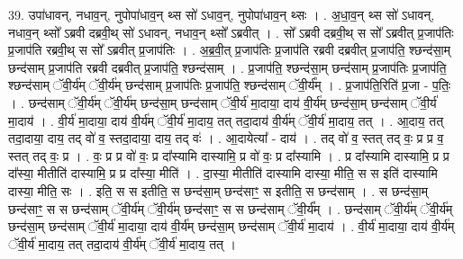 \documentclass[17pt]{extarticle}
\begin{document}
39. उपा॑धावन्, नधाव॒न्, नुपोपा॑धाव॒न् थ्स सो॑ ऽधाव॒न्, नुपोपा॑धाव॒न् थ्सः । . अ॒धा॒व॒न् थ्स सो॑ ऽधावन्, नधाव॒न् थ्सो᳚ ऽब्रवी दब्रवी॒थ् सो॑ ऽधावन्, नधाव॒न् थ्सो᳚ ऽब्रवीत् । . सो᳚ ऽब्रवी दब्रवी॒थ् स सो᳚ ऽब्रवीत् प्र॒जाप॑तिः प्र॒जाप॑ति रब्रवी॒थ् स सो᳚ ऽब्रवीत् प्र॒जाप॑तिः । . अ॒ब्र॒वी॒त् प्र॒जाप॑तिः प्र॒जाप॑ति रब्रवी दब्रवीत् प्र॒जाप॑ति॒ श्छन्द॑सा॒म् छन्द॑साम् प्र॒जाप॑ति रब्रवी दब्रवीत् प्र॒जाप॑ति॒ श्छन्द॑साम् । . प्र॒जाप॑ति॒ श्छन्द॑सा॒म् छन्द॑साम् प्र॒जाप॑तिः प्र॒जाप॑ति॒ श्छन्द॑साम् ॅवी॒र्य॑म् ॅवी॒र्य॑म् छन्द॑साम् प्र॒जाप॑तिः प्र॒जाप॑ति॒ श्छन्द॑साम् ॅवी॒र्य᳚म् । . प्र॒जाप॑ति॒रिति॑ प्र॒जा - प॒तिः॒ । . छन्द॑साम् ॅवी॒र्य॑म् ॅवी॒र्य॑म् छन्द॑सा॒म् छन्द॑साम् ॅवी॒र्य॑ मा॒दाया॒ दाय॑ वी॒र्य॑म् छन्द॑सा॒म् छन्द॑साम् ॅवी॒र्य॑ मा॒दाय॑ । . वी॒र्य॑ मा॒दाया॒ दाय॑ वी॒र्य॑म् ॅवी॒र्य॑ मा॒दाय॒ तत् तदा॒दाय॑ वी॒र्य॑म् ॅवी॒र्य॑ मा॒दाय॒ तत् । . आ॒दाय॒ तत् तदा॒दाया॒ दाय॒ तद् वो॑ व॒ स्तदा॒दाया॒ दाय॒ तद् वः॑ । . आ॒दायेत्या᳚ - दाय॑ । . तद् वो॑ व॒ स्तत् तद् वः॒ प्र प्र व॒ स्तत् तद् वः॒ प्र । . वः॒ प्र प्र वो॑ वः॒ प्र दा᳚स्यामि दास्यामि॒ प्र वो॑ वः॒ प्र दा᳚स्यामि । . प्र दा᳚स्यामि दास्यामि॒ प्र प्र दा᳚स्या॒ मीतीति॑ दास्यामि॒ प्र प्र दा᳚स्या॒ मीति॑ । . दा॒स्या॒ मीतीति॑ दास्यामि दास्या॒ मीति॒ स स इति॑ दास्यामि दास्या॒ मीति॒ सः । . इति॒ स स इतीति॒ स छन्द॑सा॒म् छन्द॑साꣳ॒॒ स इतीति॒ स छन्द॑साम् । . स छन्द॑सा॒म् छन्द॑साꣳ॒॒ स स छन्द॑साम् ॅवी॒र्य॑म् ॅवी॒र्य॑म् छन्द॑साꣳ॒॒ स स छन्द॑साम् ॅवी॒र्य᳚म् । . छन्द॑साम् ॅवी॒र्य॑म् ॅवी॒र्य॑म् छन्द॑सा॒म् छन्द॑साम् ॅवी॒र्य॑ मा॒दाया॒ दाय॑ वी॒र्य॑म् छन्द॑सा॒म् छन्द॑साम् ॅवी॒र्य॑ मा॒दाय॑ । . वी॒र्य॑ मा॒दाया॒ दाय॑ वी॒र्य॑म् ॅवी॒र्य॑ मा॒दाय॒ तत् तदा॒दाय॑ वी॒र्य॑म् ॅवी॒र्य॑ मा॒दाय॒ तत् । \newline
\pagebreak
{}
\end{document}

